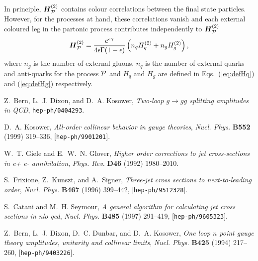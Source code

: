\documentclass[paper,notoc,nohyper]{JHEP3}
\def\P{{\cal P}}
\def\bom#1{{\mbox{\boldmath $#1$}}}
\begin{document}
In principle, ${\bom H}_{\P}^{(2)}$ contains colour correlations between the final state particles.
However, for the processes at hand, these correlations vanish and 
each external coloured
leg in the  partonic process contributes independently 
to ${\bom H}_{\P}^{(2)}$
\begin{eqnarray}
{\bom H}_{\P}^{(2)}  = \frac{e^{\epsilon\gamma}}{4 \epsilon \Gamma(1-\epsilon)}
\left(n_q H_{q}^{(2)} + n_g H_{g}^{(2)}\right),
\end{eqnarray}
where $n_g$ is the number of external gluons, $n_q$ is the number of external quarks and 
anti-quarks for the process $\P$ and $H_q$ and $H_g$ are defined in Eqs.~(\ref{eq:defHq}) and (\ref{eq:defHg})
respectively.

%
%
%
\providecommand{\href}[2]{#2}\begingroup\raggedright\begin{thebibliography}{10}

Z.~Bern, L.~J. Dixon, and D.~A. Kosower, {\it Two-loop $g\rightarrow gg$
  splitting amplitudes in {QCD}},
  \href{http://xxx.lanl.gov/abs/hep-ph/0404293}{{\tt hep-ph/0404293}}.

D.~A. Kosower, {\it All-order collinear behavior in gauge theories},  {\em
  Nucl. Phys.} {\bf B552} (1999) 319--336,
  [\href{http://xxx.lanl.gov/abs/hep-ph/9901201}{{\tt hep-ph/9901201}}].

W.~T. Giele and E.~W.~N. Glover, {\it Higher order corrections to jet
  cross-sections in e+ e- annihilation},  {\em Phys. Rev.} {\bf D46} (1992)
  1980--2010.

S.~Frixione, Z.~Kunszt, and A.~Signer, {\it Three-jet cross sections to
  next-to-leading order},  {\em Nucl. Phys.} {\bf B467} (1996) 399--442,
  [\href{http://xxx.lanl.gov/abs/hep-ph/9512328}{{\tt hep-ph/9512328}}].

S.~Catani and M.~H. Seymour, {\it A general algorithm for calculating jet cross
  sections in nlo qcd},  {\em Nucl. Phys.} {\bf B485} (1997) 291--419,
  [\href{http://xxx.lanl.gov/abs/hep-ph/9605323}{{\tt hep-ph/9605323}}].

Z.~Bern, L.~J. Dixon, D.~C. Dunbar, and D.~A. Kosower, {\it One loop $n$ point
  gauge theory amplitudes, unitarity and collinear limits},  {\em Nucl. Phys.}
  {\bf B425} (1994) 217--260,
  [\href{http://xxx.lanl.gov/abs/hep-ph/9403226}{{\tt hep-ph/9403226}}].


\end{thebibliography}
\end{document}
